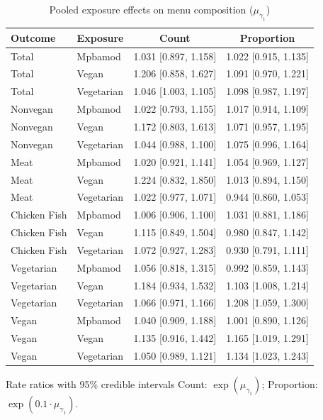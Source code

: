 \begin{table}[H]
\centering
\caption{Pooled exposure effects on menu composition ($\mu_{\gamma_1}$)}
\label{tab:a1_mu_gamma}
\begin{tabular}{llcc}
\toprule
Outcome & Exposure & Count & Proportion \\
\midrule
Total & Mpbamod & 1.031 [0.897, 1.158] & 1.022 [0.915, 1.135] \\
Total & Vegan & 1.206 [0.858, 1.627] & 1.091 [0.970, 1.221] \\
Total & Vegetarian & 1.046 [1.003, 1.105] & 1.098 [0.987, 1.197] \\
Nonvegan & Mpbamod & 1.022 [0.793, 1.155] & 1.017 [0.914, 1.109] \\
Nonvegan & Vegan & 1.172 [0.803, 1.613] & 1.071 [0.957, 1.195] \\
Nonvegan & Vegetarian & 1.044 [0.988, 1.100] & 1.075 [0.996, 1.164] \\
Meat & Mpbamod & 1.020 [0.921, 1.141] & 1.054 [0.969, 1.127] \\
Meat & Vegan & 1.224 [0.832, 1.850] & 1.013 [0.894, 1.150] \\
Meat & Vegetarian & 1.022 [0.977, 1.071] & 0.944 [0.860, 1.053] \\
Chicken Fish & Mpbamod & 1.006 [0.906, 1.100] & 1.031 [0.881, 1.186] \\
Chicken Fish & Vegan & 1.115 [0.849, 1.504] & 0.980 [0.847, 1.142] \\
Chicken Fish & Vegetarian & 1.072 [0.927, 1.283] & 0.930 [0.791, 1.111] \\
Vegetarian & Mpbamod & 1.056 [0.818, 1.315] & 0.992 [0.859, 1.143] \\
Vegetarian & Vegan & 1.184 [0.934, 1.532] & 1.103 [1.008, 1.214] \\
Vegetarian & Vegetarian & 1.066 [0.971, 1.166] & 1.208 [1.059, 1.300] \\
Vegan & Mpbamod & 1.040 [0.909, 1.188] & 1.001 [0.890, 1.126] \\
Vegan & Vegan & 1.135 [0.916, 1.442] & 1.165 [1.019, 1.291] \\
Vegan & Vegetarian & 1.050 [0.989, 1.121] & 1.134 [1.023, 1.243] \\
\bottomrule
\end{tabular}
\par\smallskip\footnotesize Rate ratios with 95\% credible intervals Count: $\exp(\mu_{\gamma_1})$; Proportion: $\exp(0.1 \cdot \mu_{\gamma_1})$.
\end{table}
